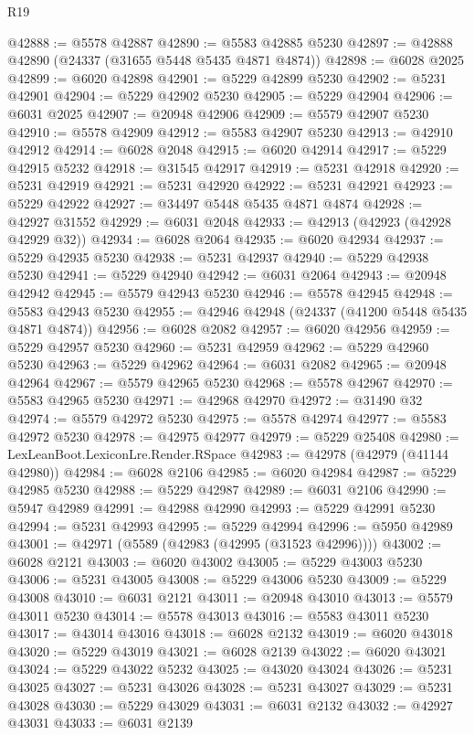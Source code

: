 \begin{lexlean}{R19}
\begin{coremodule}
@42888 := @5578 @42887
@42890 := @5583 @42885 @5230
@42897 := @42888 @42890 (@24337 (@31655 @5448 @5435 @4871 @4874))
@42898 := @6028 @2025
@42899 := @6020 @42898
@42901 := @5229 @42899 @5230
@42902 := @5231 @42901
@42904 := @5229 @42902 @5230
@42905 := @5229 @42904
@42906 := @6031 @2025
@42907 := @20948 @42906
@42909 := @5579 @42907 @5230
@42910 := @5578 @42909
@42912 := @5583 @42907 @5230
@42913 := @42910 @42912
@42914 := @6028 @2048
@42915 := @6020 @42914
@42917 := @5229 @42915 @5232
@42918 := @31545 @42917
@42919 := @5231 @42918
@42920 := @5231 @42919
@42921 := @5231 @42920
@42922 := @5231 @42921
@42923 := @5229 @42922
@42927 := @34497 @5448 @5435 @4871 @4874
@42928 := @42927 @31552
@42929 := @6031 @2048
@42933 := @42913 (@42923 (@42928 @42929 @32))
@42934 := @6028 @2064
@42935 := @6020 @42934
@42937 := @5229 @42935 @5230
@42938 := @5231 @42937
@42940 := @5229 @42938 @5230
@42941 := @5229 @42940
@42942 := @6031 @2064
@42943 := @20948 @42942
@42945 := @5579 @42943 @5230
@42946 := @5578 @42945
@42948 := @5583 @42943 @5230
@42955 := @42946 @42948 (@24337 (@41200 @5448 @5435 @4871 @4874))
@42956 := @6028 @2082
@42957 := @6020 @42956
@42959 := @5229 @42957 @5230
@42960 := @5231 @42959
@42962 := @5229 @42960 @5230
@42963 := @5229 @42962
@42964 := @6031 @2082
@42965 := @20948 @42964
@42967 := @5579 @42965 @5230
@42968 := @5578 @42967
@42970 := @5583 @42965 @5230
@42971 := @42968 @42970
@42972 := @31490 @32
@42974 := @5579 @42972 @5230
@42975 := @5578 @42974
@42977 := @5583 @42972 @5230
@42978 := @42975 @42977
@42979 := @5229 @25408
@42980 := LexLeanBoot.LexiconLre.Render.RSpace
@42983 := @42978 (@42979 (@41144 @42980))
@42984 := @6028 @2106
@42985 := @6020 @42984
@42987 := @5229 @42985 @5230
@42988 := @5229 @42987
@42989 := @6031 @2106
@42990 := @5947 @42989
@42991 := @42988 @42990
@42993 := @5229 @42991 @5230
@42994 := @5231 @42993
@42995 := @5229 @42994
@42996 := @5950 @42989
@43001 := @42971 (@5589 (@42983 (@42995 (@31523 @42996))))
@43002 := @6028 @2121
@43003 := @6020 @43002
@43005 := @5229 @43003 @5230
@43006 := @5231 @43005
@43008 := @5229 @43006 @5230
@43009 := @5229 @43008
@43010 := @6031 @2121
@43011 := @20948 @43010
@43013 := @5579 @43011 @5230
@43014 := @5578 @43013
@43016 := @5583 @43011 @5230
@43017 := @43014 @43016
@43018 := @6028 @2132
@43019 := @6020 @43018
@43020 := @5229 @43019
@43021 := @6028 @2139
@43022 := @6020 @43021
@43024 := @5229 @43022 @5232
@43025 := @43020 @43024
@43026 := @5231 @43025
@43027 := @5231 @43026
@43028 := @5231 @43027
@43029 := @5231 @43028
@43030 := @5229 @43029
@43031 := @6031 @2132
@43032 := @42927 @43031
@43033 := @6031 @2139

\end{coremodule}
\end{lexlean}
